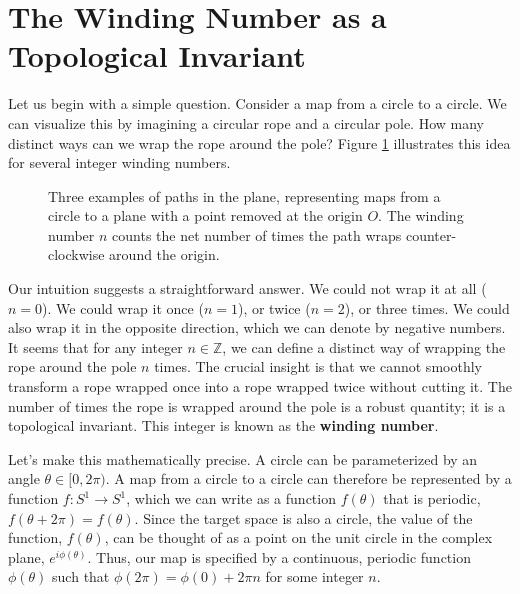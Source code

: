 \section{The Winding Number as a Topological Invariant}
\label{sec:winding_number}

Let us begin with a simple question.
Consider a map from a circle to a circle.
We can visualize this by imagining a circular rope and a circular pole.
How many distinct ways can we wrap the rope around the pole?
Figure \ref{fig:winding_examples} illustrates this idea for several integer winding numbers.

\begin{figure}[htbp]
    \centering
    
    \caption{Three examples of paths in the plane, representing maps from a circle to a plane with a point removed at the origin $O$. The winding number $n$ counts the net number of times the path wraps counter-clockwise around the origin.}
    \label{fig:winding_examples}
\end{figure}

Our intuition suggests a straightforward answer.
We could not wrap it at all ($n=0$).
We could wrap it once ($n=1$), or twice ($n=2$), or three times.
We could also wrap it in the opposite direction, which we can denote by negative numbers.
It seems that for any integer $n \in \mathbb{Z}$, we can define a distinct way of wrapping the rope around the pole $n$ times.
The crucial insight is that we cannot smoothly transform a rope wrapped once into a rope wrapped twice without cutting it.
The number of times the rope is wrapped around the pole is a robust quantity; it is a topological invariant.
This integer is known as the \textbf{winding number}.

Let's make this mathematically precise.
A circle can be parameterized by an angle $\theta \in [0, 2\pi)$.
A map from a circle to a circle can therefore be represented by a function $f: S^1 \to S^1$, which we can write as a function $f(\theta)$ that is periodic, $f(\theta + 2\pi) = f(\theta)$.
Since the target space is also a circle, the value of the function, $f(\theta)$, can be thought of as a point on the unit circle in the complex plane, $e^{i\phi(\theta)}$.
Thus, our map is specified by a continuous, periodic function $\phi(\theta)$ such that $\phi(2\pi) = \phi(0) + 2\pi n$ for some integer $n$.

